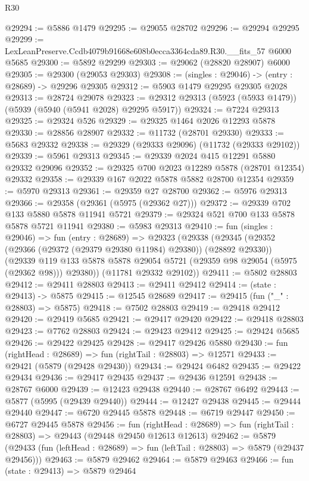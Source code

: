 \begin{lexlean}{R30}
\begin{coremodule}
@29294 := @5886 @1479
@29295 := @29055 @28702
@29296 := @29294 @29295
@29299 := LexLeanPreserve.Ccdb4079b91668e608b0ecca3364cda89.R30.__fits_57 @6000 @5685
@29300 := @5892 @29299
@29303 := @29062 (@28820 @28907) @6000
@29305 := @29300 (@29053 @29303)
@29308 := (singles : @29046) -> (entry : @28689) -> @29296 @29305
@29312 := @5903 @1479 @29295 @29305 @2028
@29313 := @28724 @29078
@29323 := @29312 @29313 (@5923 (@5933 @1479)) (@5939 (@5940 (@5941 @2028) @29295 @5917))
@29324 := @7224 @29313
@29325 := @29324 @526
@29329 := @29325 @1464 @2026 @12293 @5878
@29330 := @28856 @28907
@29332 := @11732 (@28701 @29330)
@29333 := @5683 @29332
@29338 := @29329 (@29333 @29096) (@11732 (@29333 @29102))
@29339 := @5961 @29313
@29345 := @29339 @2024 @415 @12291 @5880 @29332 @29096
@29352 := @29325 @700 @2023 @12289 @5878 (@28701 @12354) @29332
@29358 := @29339 @167 @2022 @5878 @5882 @28700 @12354
@29359 := @5970 @29313
@29361 := @29359 @27 @28700
@29362 := @5976 @29313
@29366 := @29358 (@29361 (@5975 (@29362 @27)))
@29372 := @29339 @702 @133 @5880 @5878 @11941 @5721
@29379 := @29324 @521 @700 @133 @5878 @5878 @5721 @11941
@29380 := @5983 @29313
@29410 := fun (singles : @29046) =>
  fun (entry : @28689) =>
  @29323
    (@29338
      (@29345
        (@29352 (@29366 (@29372 (@29379 @29380 @11984) @29380)) (@28892 @29330))
        (@29339 @119 @133 @5878 @5878 @29054 @5721 (@29359 @98 @29054 (@5975 (@29362 @98))) @29380))
      (@11781 @29332 @29102))
@29411 := @5802 @28803
@29412 := @29411 @28803
@29413 := @29411 @29412
@29414 := (state : @29413) -> @5875
@29415 := @12545 @28689
@29417 := @29415 (fun ("_" : @28803) => @5875)
@29418 := @7502 @28803
@29419 := @29418 @29412
@29420 := @29419 @5685
@29421 := @29417 @29420
@29422 := @29418 @28803
@29423 := @7762 @28803
@29424 := @29423 @29412
@29425 := @29424 @5685
@29426 := @29422 @29425
@29428 := @29417 @29426 @5880
@29430 := fun (rightHead : @28689) => fun (rightTail : @28803) => @12571
@29433 := @29421 (@5879 (@29428 @29430))
@29434 := @29424 @6482
@29435 := @29422 @29434
@29436 := @29417 @29435
@29437 := @29436 @12591
@29438 := @28767 @6000
@29439 := @12423 @29438
@29440 := @28767 @6492
@29443 := @5877 (@5995 (@29439 @29440))
@29444 := @12427 @29438
@29445 := @29444 @29440
@29447 := @6720 @29445 @5878
@29448 := @6719 @29447
@29450 := @6727 @29445 @5878
@29456 := fun (rightHead : @28689) =>
  fun (rightTail : @28803) => @29443 (@29448 @29450 @12613 @12613)
@29462 := @5879
    (@29433 (fun (leftHead : @28689) => fun (leftTail : @28803) => @5879 (@29437 @29456)))
@29463 := @5879 @29462
@29464 := @5879 @29463
@29466 := fun (state : @29413) => @5879 @29464

\end{coremodule}
\end{lexlean}
